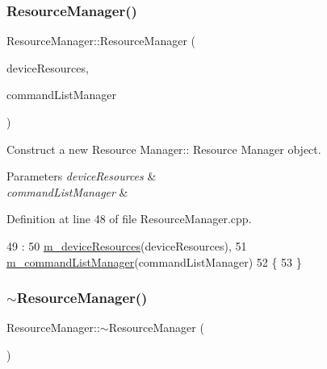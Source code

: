 \subsubsection{\texorpdfstring{Resource\+Manager()}{ResourceManager()}}
{\footnotesize\ttfamily Resource\+Manager\+::\+Resource\+Manager (\begin{DoxyParamCaption}\item[{std\+::shared\+\_\+ptr$<$ \mbox{\hyperlink{class_d_x_1_1_device_resources}{D\+X\+::\+Device\+Resources}} $>$}]{device\+Resources,  }\item[{std\+::shared\+\_\+ptr$<$ \mbox{\hyperlink{class_command_list_manager}{Command\+List\+Manager}} $>$}]{command\+List\+Manager }\end{DoxyParamCaption})}



Construct a new Resource Manager\+:\+: Resource Manager object. 


\begin{DoxyParams}{Parameters}
{\em device\+Resources} & \\
\hline
{\em command\+List\+Manager} & \\
\hline
\end{DoxyParams}


Definition at line 48 of file Resource\+Manager.\+cpp.


\begin{DoxyCode}
49                                                                 :
50     \mbox{\hyperlink{class_resource_manager_a91ec892c6045e5911c24c80b4112cad4}{m\_deviceResources}}(deviceResources),
51     \mbox{\hyperlink{class_resource_manager_ad215168d29e86e1c705337d2625c0a05}{m\_commandListManager}}(commandListManager)
52 \{
53 \}
\end{DoxyCode}
\mbox{\label{class_resource_manager_a671c186e4630599e7e36d000c53eaf80}} 
\subsubsection{\texorpdfstring{$\sim$\+Resource\+Manager()}{~ResourceManager()}}
{\footnotesize\ttfamily Resource\+Manager\+::$\sim$\+Resource\+Manager (\begin{DoxyParamCaption}{ }\end{DoxyParamCaption})}



